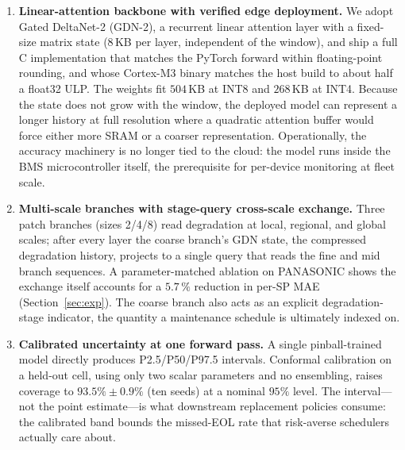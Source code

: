 \documentclass[final,5p,times,twocolumn]{elsarticle}
\begin{document}
\begin{enumerate}
\item \textbf{Linear-attention backbone with verified edge
deployment.} We adopt Gated DeltaNet-2 (GDN-2), a recurrent linear
attention layer with a fixed-size matrix state ($8$\,KB per layer,
independent of the window), and ship a full C
implementation that matches the PyTorch forward within
floating-point rounding, and whose Cortex-M3 binary matches the host
build to about half a float32 ULP. The weights fit $504$\,KB at INT8
and $268$\,KB at INT4. Because the state
does not grow with the window, the deployed model can represent a
longer history at full resolution where a quadratic attention buffer
would force either more SRAM or a coarser representation.
Operationally, the accuracy machinery is no longer tied to the
cloud: the model runs inside the BMS microcontroller itself, the
prerequisite for per-device monitoring at fleet scale.

\item \textbf{Multi-scale branches with stage-query cross-scale
exchange.} Three patch branches (sizes 2/4/8) read degradation at
local, regional, and global scales; after every layer the coarse
branch's GDN state, the compressed degradation history, projects to
a single query that reads the fine and mid branch sequences.
A parameter-matched ablation on PANASONIC shows the exchange itself
accounts for a $5.7\,\%$ reduction in per-SP MAE
(Section~\ref{sec:exp}). The coarse
branch also
acts as an explicit degradation-stage indicator, the quantity a
maintenance schedule is ultimately indexed on.

\item \textbf{Calibrated uncertainty at one forward pass.} A single pinball-trained model
directly produces P2.5/P50/P97.5 intervals. Conformal calibration on a held-out cell,
using only two scalar parameters and no ensembling, raises coverage to $93.5\%\pm0.9\%$ (ten seeds)
at a nominal $95\%$ level. The interval---not the point estimate---is
what downstream replacement policies consume: the calibrated band bounds the missed-EOL rate
that risk-averse schedulers actually care about.


\end{enumerate}
\end{document}
